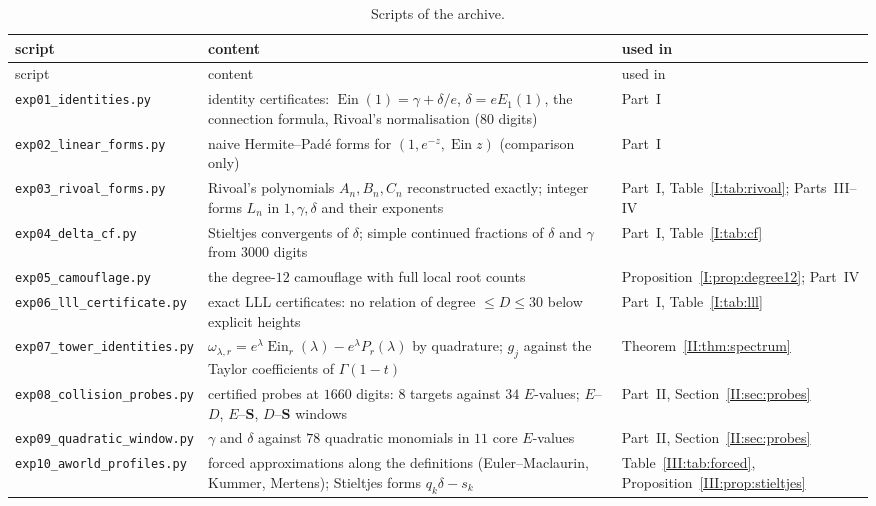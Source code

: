 \documentclass[11pt,a4paper]{article}
\newcommand{\Ein}{\operatorname{Ein}}
\newcommand{\Sring}{\mathbf S}
\theoremstyle{definition}
\theoremstyle{remark}
\numberwithin{equation}{section}
\begin{document}
\begin{footnotesize}
\begin{longtable}{@{}>{\raggedright\arraybackslash}p{47mm}>{\raggedright\arraybackslash}p{77mm}>{\raggedright\arraybackslash}p{24mm}@{}}
\caption{Scripts of the archive.}\label{tab:archive}\\
\toprule
script & content & used in\\
\midrule
\endfirsthead
\toprule
script & content & used in\\
\midrule
\endhead
\texttt{exp01\_identities.py} & identity certificates: $\Ein(1)=\gamma+\delta/e$, $\delta=eE_1(1)$, the connection formula, Rivoal's normalisation ($80$ digits) & Part~I\\
\texttt{exp02\_linear\_forms.py} & naive Hermite--Pad\'e forms for $(1,e^{-z},\Ein z)$ (comparison only) & Part~I\\
\texttt{exp03\_rivoal\_forms.py} & Rivoal's polynomials $A_n,B_n,C_n$ reconstructed exactly; integer forms $L_n$ in $1,\gamma,\delta$ and their exponents & Part~I, Table~\ref{I:tab:rivoal}; Parts~III--IV\\
\texttt{exp04\_delta\_cf.py} & Stieltjes convergents of $\delta$; simple continued fractions of $\delta$ and $\gamma$ from $3000$ digits & Part~I, Table~\ref{I:tab:cf}\\
\texttt{exp05\_camouflage.py} & the degree-$12$ camouflage with full local root counts & Proposition~\ref{I:prop:degree12}; Part~IV\\
\texttt{exp06\_lll\_certificate.py} & exact LLL certificates: no relation of degree $\le D\le30$ below explicit heights & Part~I, Table~\ref{I:tab:lll}\\
\texttt{exp07\_tower\_identities.py} & $\omega_{\lambda,r}=e^\lambda\Ein_r(\lambda)-e^\lambda P_r(\lambda)$ by quadrature; $g_j$ against the Taylor coefficients of $\Gamma(1-t)$ & Theorem~\ref{II:thm:spectrum}\\
\texttt{exp08\_collision\_probes.py} & certified probes at $1660$ digits: $8$ targets against $34$ $E$-values; $E$--$D$, $E$--$\Sring$, $D$--$\Sring$ windows & Part~II, Section~\ref{II:sec:probes}\\
\texttt{exp09\_quadratic\_window.py} & $\gamma$ and $\delta$ against $78$ quadratic monomials in $11$ core $E$-values & Part~II, Section~\ref{II:sec:probes}\\
\texttt{exp10\_aworld\_profiles.py} & forced approximations along the definitions (Euler--Maclaurin, Kummer, Mertens); Stieltjes forms $q_k\delta-s_k$ & Table~\ref{III:tab:forced}, Proposition~\ref{III:prop:stieltjes}\\

\end{longtable}
\end{footnotesize}
\end{document}
